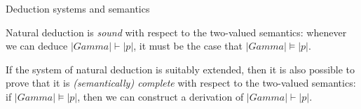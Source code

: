 \documentclass[t,compress,hyperref={hidelinks}]{beamer}
\begin{document}
\begin{frame}{Deduction systems and semantics}

Natural deduction is \emph{sound} with respect to the two-valued semantics: whenever we can deduce $|Gamma| \vdash |p|$, it must be the case that $|Gamma| \models |p|$.

If the system of natural deduction is suitably extended, then it is also possible to prove that it is \emph{(semantically) complete} with respect to the two-valued semantics: if $|Gamma| \models |p|$, then we can construct a derivation of $|Gamma| \vdash |p|$.

\end{frame}
\end{document}
